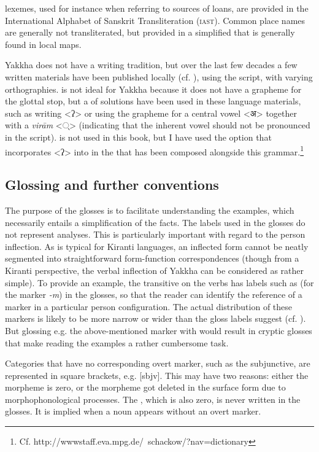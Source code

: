  lexemes, used for instance when referring to sources of loans, are provided in the International Alphabet of Sanskrit Transliteration (\textsc{iast}). Common place names are generally not transliterated, but provided in a simplified  that is generally found in local maps.

Yakkha does not have a writing tradition, but over the last few decades a few written materials have been published locally (cf. ), using the  script, with varying orthographies.  is not ideal for Yakkha because it does not have a grapheme for the glottal stop, but a  of solutions have been used in these language materials, such as writing <ʔ>  or using the grapheme for a central vowel <{\Deva अ}> together with a \emph{virām} <{\Deva  ्}>  (indicating that the inherent vowel should not be pronounced in the  script).   is not used in this book, but  I have used the option that incorporates <ʔ> into  in the  that has been composed alongside this grammar.\footnote{Cf. http://wwwstaff.eva.mpg.de/~schackow/?nav=dictionary}


\subsection{Glossing and further conventions}

The purpose of the glosses is to facilitate understanding the examples, which necessarily entails a simplification of the facts. The labels used in the glosses do not represent analyses. This is particularly important with regard to the person inflection. As is typical for Kiranti languages, an inflected form cannot be neatly segmented into straightforward form-function correspondences (though from a  Kiranti perspective, the verbal inflection of Yakkha can be considered as rather simple). To provide an example, the transitive  on the verbs has labels such as  (for the marker \emph{-m}) in the glosses, so that the reader can identify the reference of a marker in a particular person configuration. The actual distribution of these markers is likely to be more narrow or wider than the gloss labels suggest (cf. ). But glossing e.g. the above-mentioned marker with   would result in cryptic glosses that make reading the examples a rather cumbersome task. 

Categories that have no corresponding overt marker, such as the subjunctive, are represented in square brackets, e.g. [{\sc sbjv}]. This may have two reasons: either the morpheme is zero, or the morpheme got deleted in the surface form due to morphophonological processes. The , which is also zero, is never written in the glosses. It is implied when a noun appears without an overt  marker. 

